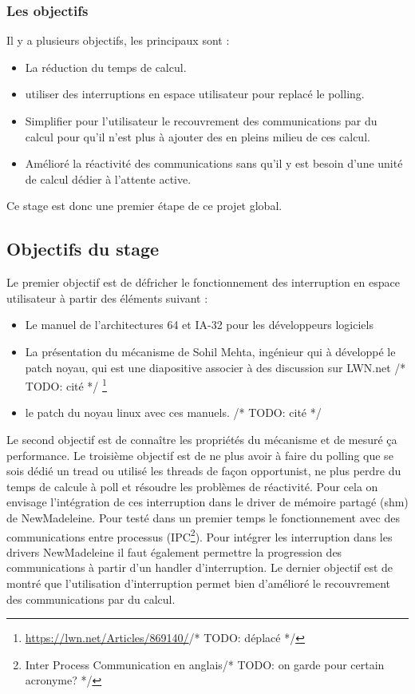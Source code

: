 
\subsubsection{Les objectifs}

Il y a plusieurs objectifs, les principaux sont :

\begin{itemize}
  \item La réduction du temps de calcul.
  \item utiliser des interruptions en espace utilisateur pour replacé le polling.
  \item Simplifier pour l'utilisateur le recouvrement des communications par du calcul pour qu'il n'est plus à ajouter des  en pleins milieu de ces calcul.
  \item Amélioré la réactivité des communications sans qu'il y est besoin d'une unité de calcul dédier à l'attente active.
\end{itemize}

Ce stage est donc une premier étape de ce projet global.

\subsection{Objectifs du stage}

Le premier objectif est de défricher le fonctionnement des interruption en espace utilisateur à partir des éléments suivant :
\begin{itemize}
  \item Le manuel \intel{} de l'architectures 64 et IA-32 pour les développeurs logiciels
  \item La présentation du mécanisme de Sohil Mehta, ingénieur \intel{} qui à développé le patch noyau, qui est une diapositive associer à des discussion sur LWN.net /* TODO: cité */ \footnote{\url{https://lwn.net/Articles/869140/}/* TODO: déplacé */}
  \item le patch du noyau linux avec ces manuels. /* TODO: cité */
\end{itemize}
Le second objectif est de connaître les propriétés du mécanisme et de mesuré ça performance.
Le troisième objectif est de ne plus avoir à faire du polling que se sois dédié un tread ou utilisé les threads de façon opportunist, ne plus perdre du temps de calcule à poll et résoudre les problèmes de réactivité.
Pour cela on envisage l'intégration de ces interruption dans le driver de mémoire partagé (shm) de NewMadeleine.
Pour testé dans un premier temps le fonctionnement avec des communications entre processus (IPC\footnote{Inter Process Communication en anglais/* TODO: on garde pour certain acronyme? */}).
Pour intégrer les interruption dans les drivers NewMadeleine il faut également permettre la progression des communications à partir d'un handler d'interruption.
Le dernier objectif est de montré que l'utilisation d'interruption permet bien d'amélioré le recouvrement des communications par du calcul.

